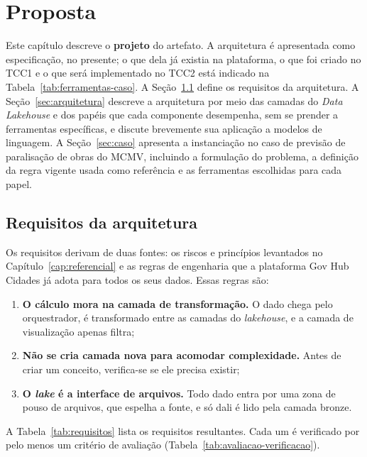 \chapter[Proposta]{Proposta}
\label{cap:proposta}

Este capítulo descreve o \textbf{projeto} do artefato. A arquitetura é apresentada como especificação, no presente; o que dela já existia na plataforma, o que foi criado no TCC1 e o que será implementado no TCC2 está indicado na Tabela~\ref{tab:ferramentas-caso}. A Seção~\ref{sec:requisitos} define os requisitos da arquitetura. A Seção~\ref{sec:arquitetura} descreve a arquitetura por meio das camadas do \textit{Data Lakehouse} e dos papéis que cada componente desempenha, sem se prender a ferramentas específicas, e discute brevemente sua aplicação a modelos de linguagem. A Seção~\ref{sec:caso} apresenta a instanciação no caso de previsão de paralisação de obras do MCMV, incluindo a formulação do problema, a definição da regra vigente usada como referência e as ferramentas escolhidas para cada papel.

\section{Requisitos da arquitetura}
\label{sec:requisitos}

Os requisitos derivam de duas fontes: os riscos e princípios levantados no Capítulo~\ref{cap:referencial} e as regras de engenharia que a plataforma Gov Hub Cidades já adota para todos os seus dados. Essas regras são:

\begin{enumerate}
	\item \textbf{O cálculo mora na camada de transformação.} O dado chega pelo orquestrador, é transformado entre as camadas do \textit{lakehouse}, e a camada de visualização apenas filtra;
	\item \textbf{Não se cria camada nova para acomodar complexidade.} Antes de criar um conceito, verifica-se se ele precisa existir;
	\item \textbf{O \textit{lake} é a interface de arquivos.} Todo dado entra por uma zona de pouso de arquivos, que espelha a fonte, e só dali é lido pela camada bronze.
\end{enumerate}

A Tabela~\ref{tab:requisitos} lista os requisitos resultantes. Cada um é verificado por pelo menos um critério de avaliação (Tabela~\ref{tab:avaliacao-verificacao}).


